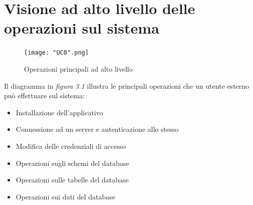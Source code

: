 \documentclass[a4paper]{report}
\begin{document}
		\section{Visione ad alto livello delle operazioni sul sistema}
		 	\begin{figure}[H]
				\centering
				\texttt{[image: "UC0".png]}
				\caption{Operazioni principali ad alto livello}
			\end{figure}
			Il diagramma in \emph{figura 3.1} illustra le principali operazioni che un utente esterno può
			 effettuare sul sistema:
			\begin{itemize}
				\item Installazione dell'applicativo
				\item Connessione ad un server e autenticazione allo stesso
				\item Modifica delle credenziali di accesso
				\item Operazioni sugli schemi del database
				\item Operazioni sulle tabelle del database
				\item Operazioni sui dati del database
			\end{itemize}
\end{document}
